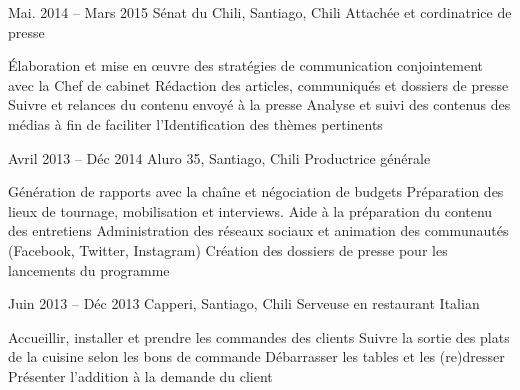 \documentclass[30pt, french]{tccv}
\begin{document}
\begin{upshape}
\begin{experience}
\begin{itemize}
\end{itemize}       





  
\setlength{\parskip}{0pt}
\item{Mai. 2014 -- Mars 2015 }     
  {Sénat du Chili, Santiago, Chili}     
  {Attachée et cordinatrice de presse}
  \fontsize{9pt}{1em}\color{text}\bodyfontlight\upshape\selectfont

  
\begin{itemize}
      \cvitem[\checkmark] Élaboration et mise en œuvre des stratégies de communication conjointement avec la Chef de cabinet
      \cvitem[\checkmark] Rédaction des articles, communiqués et dossiers de presse
      \cvitem[\checkmark] Suivre et relances du contenu envoyé à la presse
      \cvitem[\checkmark] Analyse et suivi des contenus des médias à fin de faciliter l'Identification des thèmes pertinents
\end{itemize}        




\setlength{\parskip}{0pt}
\item{Avril 2013 -- Déc 2014 }     
  {Aluro 35, Santiago, Chili}     
  {Productrice générale}
\fontsize{9pt}{1em}\color{text}\bodyfontlight\upshape\selectfont

    
\begin{itemize}
      \cvitem[\checkmark] Génération de rapports avec la chaîne et négociation de budgets                   
      \cvitem[\checkmark] Préparation des lieux de tournage, mobilisation et interviews. Aide à la préparation du contenu des entretiens   
      \cvitem[\checkmark] Administration des réseaux sociaux et animation des communautés (Facebook, Twitter, Instagram)                                                                    
      \cvitem[\checkmark] Création des dossiers de presse pour les lancements du programme      
\end{itemize}      
  


\setlength{\parskip}{0pt}
\item{\color{text} Juin 2013 -- Déc 2013}
     {Capperi, Santiago, Chili}
     {Serveuse en restaurant Italian}
     \fontsize{9pt}{1em}\color{text}\bodyfontlight\upshape\selectfont

    \begin{itemize}
      \cvitem[\checkmark] Accueillir, installer et prendre les commandes des clients
      \cvitem[\checkmark] Suivre la sortie des plats de la cuisine selon les bons de commande
      \cvitem[\checkmark] Débarrasser les tables et les (re)dresser
      \cvitem[\checkmark] Présenter l’addition à la demande du client
      
    \end{itemize}       
  
  

\end{experience}






\end{upshape}
\end{document}
